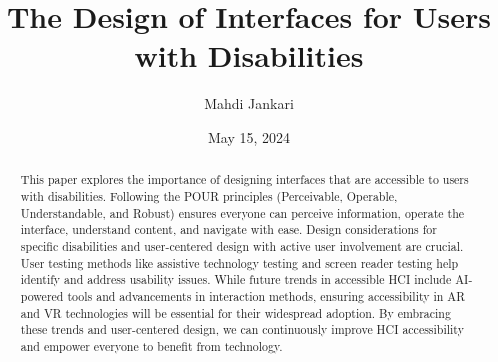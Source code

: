 \documentclass[a4paper, 12pt]{article}
\title{The Design of Interfaces for Users with Disabilities}
\author{Mahdi Jankari}
\date{May 15, 2024}
\begin{document}
\maketitle

\begin{abstract}
This paper explores the importance of designing interfaces that are accessible
to users with disabilities. Following the POUR principles (Perceivable,
Operable, Understandable, and Robust) ensures everyone can perceive information,
operate the interface, understand content, and navigate with ease. Design
considerations for specific disabilities and user-centered design with active
user involvement are crucial. User testing methods like assistive technology
testing and screen reader testing help identify and address usability issues.
While future trends in accessible HCI include AI-powered tools and advancements
in interaction methods, ensuring accessibility in AR and VR technologies will be
essential for their widespread adoption. By embracing these trends and
user-centered design, we can continuously improve HCI accessibility and empower
everyone to benefit from technology.
\end{abstract}








\end{document}
